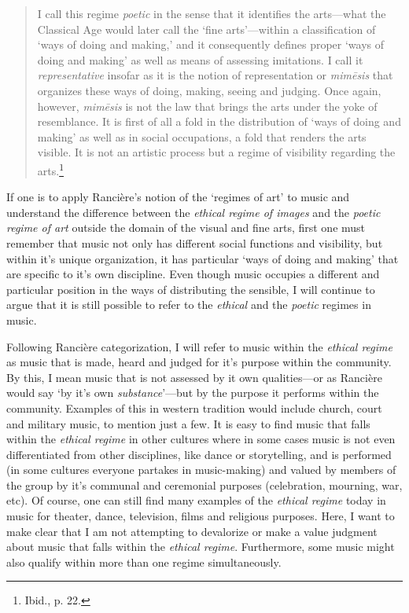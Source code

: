 \begin{quote}
I call this regime \emph{poetic} in the sense that it identifies the arts---what the Classical Age would later call the `fine arts'---within a classification of `ways of doing and making,' and it consequently defines proper `ways of doing and making' as well as means of assessing imitations. I call it \emph{representative} insofar as it is the notion of representation or \emph{mim\={e}sis} that organizes these ways of doing, making, seeing and judging. Once again, however, \emph{mim\={e}sis} is not the law that brings the arts under the yoke of resemblance. It is first of all a fold in the distribution of `ways of doing and making' as well as in social occupations, a fold that renders the arts visible. It is not an artistic process but a regime of visibility regarding the arts.\footnote{Ibid., p. 22.}
\end{quote}

If one is to apply Ranci\`{e}re's notion of the `regimes of art' to music and understand the difference between the \emph{ethical regime of images} and the \emph{poetic regime of art} outside the domain of the visual and fine arts, first one must remember that music not only has different social functions and visibility, but within it's unique organization, it has particular `ways of doing and making' that are specific to it's own discipline. Even though music occupies a different and particular position in the ways of distributing the sensible, I will continue to argue that it is still possible to refer to the \emph{ethical} and the \emph{poetic} regimes in music. 

Following Ranci\`{e}re categorization, I will refer to music within the \emph{ethical regime} as music that is made, heard and judged for it's purpose within the community. By this, I mean music that is not assessed by it own qualities---or as Ranci\`{e}re would say `by it's own \emph{substance}'---but by the purpose it performs within the community. Examples of this in western tradition would include church, court and military music, to mention just a few. It is easy to find music that falls within the \emph{ethical regime} in other cultures where in some cases music is not even differentiated from other disciplines, like dance or storytelling, and is performed (in some cultures everyone partakes in music-making) and valued by members of the group by it's communal and ceremonial purposes (celebration, mourning, war, etc). Of course, one can still find many examples of the \emph{ethical regime} today in music for theater, dance, television, films and religious purposes. Here, I want to make clear that I am not attempting to devalorize or make a value judgment about music that falls within the \emph{ethical regime}. Furthermore, some music might also qualify within more than one regime simultaneously.

